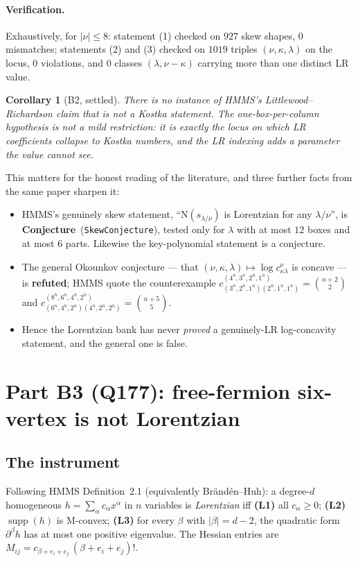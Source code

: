 \documentclass[11pt]{article}
\newtheorem{corollary}[theorem]{Corollary}
\theoremstyle{definition}
\newcommand{\N}{\mathrm{N}}
\newcommand{\supp}{\operatorname{supp}}
\begin{document}
\paragraph{Verification.} Exhaustively, for $|\nu|\le8$: statement (1) checked on $927$
skew shapes, $0$ mismatches; statements (2) and (3) checked on $1019$ triples
$(\nu,\kappa,\lambda)$ on the locus, $0$ violations, and $0$ classes
$(\lambda,\nu-\kappa)$ carrying more than one distinct LR value.

\begin{corollary}[B2, settled]
There is no instance of HMMS's Littlewood--Richardson claim that is not a Kostka statement. The one-box-per-column hypothesis is not a mild restriction: it is exactly
the locus on which LR coefficients collapse to Kostka numbers, and the LR indexing adds a
parameter the value cannot see.
\end{corollary}

This matters for the honest reading of the literature, and three further facts from the same
paper sharpen it:
\begin{itemize}
\item HMMS's genuinely skew statement, ``$\N(s_{\lambda/\nu})$ is Lorentzian for any
$\lambda/\nu$'', is \textbf{Conjecture}~(\texttt{SkewConjecture}), tested only for
$\lambda$ with at most $12$ boxes and at most $6$ parts. Likewise the key-polynomial
statement is a conjecture.
\item The general Okounkov conjecture --- that $(\nu,\kappa,\lambda)\mapsto\log c^\nu_{\kappa\lambda}$
is concave --- is \textbf{refuted}; HMMS quote the counterexample
$c^{(4^n,3^n,2^n,1^n)}_{(3^n,2^n,1^n)(2^n,1^n,1^n)}=\binom{n+2}{2}$ and
$c^{(8^n,6^n,4^n,2^n)}_{(6^n,4^n,2^n)(4^n,2^n,2^n)}=\binom{n+5}{5}$.
\item Hence the Lorentzian bank has never \emph{proved} a genuinely-LR log-concavity
statement, and the general one is false.
\end{itemize}

\section{Part B3 (Q177): free-fermion six-vertex is not Lorentzian}

\subsection{The instrument}

Following HMMS Definition~2.1 (equivalently Br\"and\'en--Huh): a degree-$d$ homogeneous
$h=\sum_\alpha c_\alpha x^\alpha$ in $n$ variables is \emph{Lorentzian} iff
\textbf{(L1)} all $c_\alpha\ge0$; \textbf{(L2)} $\supp(h)$ is M-convex; \textbf{(L3)} for
every $\beta$ with $|\beta|=d-2$, the quadratic form $\partial^\beta h$ has at most one
positive eigenvalue. The Hessian entries are
$M_{ij}=c_{\beta+e_i+e_j}\,(\beta+e_i+e_j)!$.
\end{document}
